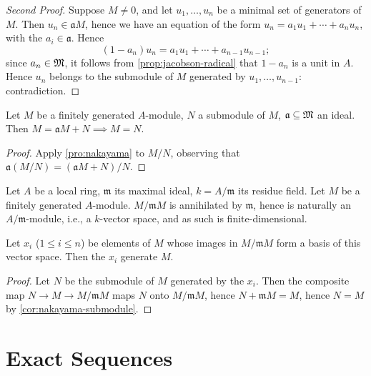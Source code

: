 \begin{proof}[Second Proof]
    Suppose $M \neq 0$, and let $u_1, \ldots, u_n$ be a minimal set of generators of $M$. Then $u_n \in \mathfrak{a}M$, hence we have an equation of the form $u_n = a_1 u_1 + \cdots + a_n u_n$, with the $a_i \in \mathfrak{a}$. Hence
    \[
        (1 - a_n)u_n = a_1 u_1 + \cdots + a_{n-1}u_{n-1};
    \]
    since $a_n \in \mathfrak{M}$, it follows from \eqref{prop:jacobson-radical} that $1 - a_n$ is a unit in $A$. Hence $u_n$ belongs to the submodule of $M$ generated by $u_1, \ldots, u_{n-1}$: contradiction.
\end{proof}

\begin{corollary}\label{cor:nakayama-submodule}
    Let $M$ be a finitely generated $A$-module, $N$ a submodule of $M$, $\mathfrak{a} \subseteq \mathfrak{M}$ an ideal. Then $M = \mathfrak{a}M + N \implies M = N$.
\end{corollary}

\begin{proof}
    Apply \eqref{pro:nakayama} to $M/N$, observing that $\mathfrak{a}(M/N) = (\mathfrak{a}M + N)/N$.
\end{proof}

Let $A$ be a local ring, $\mathfrak{m}$ its maximal ideal, $k = A/\mathfrak{m}$ its residue field. Let $M$ be a finitely generated $A$-module. $M/\mathfrak{m}M$ is annihilated by $\mathfrak{m}$, hence is naturally an $A/\mathfrak{m}$-module, i.e., a $k$-vector space, and as such is finite-dimensional.

\begin{proposition}\label{prop:generate-modulo-maximal}
Let $x_i$ ($1 \leq i \leq n$) be elements of $M$ whose images in $M/\mathfrak{m}M$ form a basis of this vector space. Then the $x_i$ generate $M$.
\end{proposition}

\begin{proof}
Let $N$ be the submodule of $M$ generated by the $x_i$. Then the composite map $N \to M \to M/\mathfrak{m}M$ maps $N$ onto $M/\mathfrak{m}M$, hence $N + \mathfrak{m}M = M$, hence $N = M$ by \eqref{cor:nakayama-submodule}.
\end{proof}

\section*{Exact Sequences}

